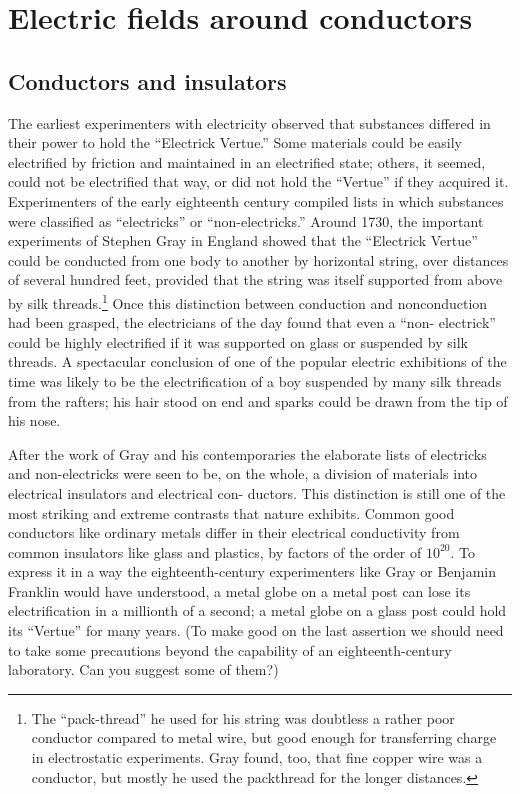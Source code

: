 \chapter{Electric fields around conductors}

\section{Conductors and insulators}

The earliest experimenters with electricity observed that substances
differed in their power to hold the ``Electrick Vertue.'' Some
materials could be easily electrified by friction and maintained in an
electrified state; others, it seemed, could not be electrified that way,
or did not hold the ``Vertue'' if they acquired it. Experimenters of
the early eighteenth century compiled lists in which substances were
classified as ``electricks'' or ``non-electricks.'' Around 1730, the important
experiments of Stephen Gray in England showed that the
``Electrick Vertue'' could be conducted from one body to another by
horizontal string, over distances of several hundred feet, provided
that the string was itself supported from above by silk 
threads.\footnote{The ``pack-thread'' he used for his string was doubtless a rather poor conductor
compared to metal wire, but good enough for transferring charge in electrostatic 
experiments. Gray found, too, that fine copper wire was a conductor, but mostly he
used the packthread for the longer distances.}
Once this distinction between conduction and nonconduction had
been grasped, the electricians of the day found that even a ``non-
electrick'' could be highly electrified if it was supported on glass or
suspended by silk threads. A spectacular conclusion of one of the
popular electric exhibitions of the time was likely to be the electrification
of a boy suspended by many silk threads from the rafters; his
hair stood on end and sparks could be drawn from the tip of his nose.

After the work of Gray and his contemporaries the elaborate lists
of electricks and non-electricks were seen to be, on the whole, a
division of materials into electrical insulators and electrical con-
ductors. This distinction is still one of the most striking and extreme
contrasts that nature exhibits. Common good conductors like
ordinary metals differ in their electrical conductivity from common
insulators like glass and plastics, by factors of the order of $10^{20}$. To
express it in a way the eighteenth-century experimenters like Gray
or Benjamin Franklin would have understood, a metal globe on a
metal post can lose its electrification in a millionth of a second; a
metal globe on a glass post could hold its ``Vertue'' for many years.
(To make good on the last assertion we should need to take some 
precautions beyond the capability of an eighteenth-century laboratory.
Can you suggest some of them?)


